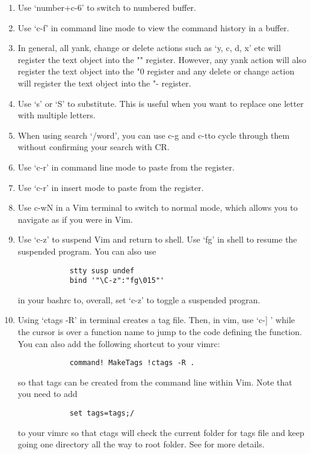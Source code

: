 \begin{enumerate}
        leader\trangle b:ls\tlangle cr\trangle:b\tlangle space\trangle
    \item Use `\tlangle number\trangle +\tlangle c-6\trangle' to switch to numbered buffer.
    \item Use `\tlangle c-f\trangle' in command line mode to view the command history in a
        buffer.
    \item In general, all yank, change or delete actions such as `y, c, d, x'
        etc will register the text object into the "" register. However, any
        yank action will also register the text object into the "0 register and
        any delete or change action will register the text object into the "-
        register.
    \item Use `s' or `S' to substitute. This is useful when you want to replace
        one letter with multiple letters.
    \item When using search `/\tlangle word\trangle', you can use \tlangle c-g
        \trangle and \tlangle c-t\trangle to cycle through them without
        confirming your search with \tlangle CR\trangle.
    \item Use `\tlangle c-r\trangle' in command line mode to paste from the
        register.
    \item Use `\tlangle c-r\trangle' in insert mode to paste from the register.
    \item Use \tlangle c-w\trangle N in a Vim terminal to switch to normal mode, which allows
        you to navigate as if you were in Vim.
    \item Use `\tlangle c-z\trangle' to suspend Vim and return to shell. Use `fg'
        in shell to resume the suspended program. You can also use
        \begin{lstlisting}
            stty susp undef
            bind '"\C-z":"fg\015"'
        \end{lstlisting}
        in your bashrc to, overall, set `\tlangle c-z\trangle' to toggle a
        suspended progran.
    \item Using `ctags -R' in terminal creates a tag file. Then, in vim, use
        `\tlangle c-$]$ \trangle' while the cursor is over a function name to
        jump to the code defining the function. You can also add the following
        shortcut to your vimrc:
        \begin{lstlisting}
            command! MakeTags !ctags -R .
        \end{lstlisting}
        so that tags can be created from the command line within Vim.
        Note that you need to add
        \begin{lstlisting}
            set tags=tags;/
        \end{lstlisting}
        to your vimrc so that ctags will check the current folder for tags file
        and keep going one directory all the way to root folder. See
        \cite{ben2011ctags} for more details.
\end{enumerate}

